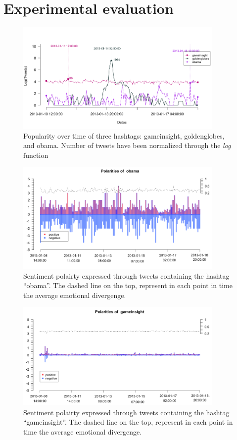 \section{Experimental evaluation}
\label{sec:results}
\begin{figure}[!Ht]
\includegraphics[width=0.9\textwidth]{images/3-plots.png} 
\caption{Popularity over time of three hashtags: gameinsight, goldenglobes, and obama. Number of tweets have been normalized through the \emph{log} function}
\label{fig:trends}
\end{figure}

\begin{figure}[!Ht]
\includegraphics[width=0.9\textwidth]{images/obama-sentiment.png} 
\caption{Sentiment polairty expressed through tweets containing the hashtag ``obama''. The dashed line on the top, represent in each point in time the average emotional divergenge.}
\label{fig:obama-sentiment}
\end{figure}

\begin{figure}[!Ht]
\includegraphics[width=0.9\textwidth]{images/game-sentiment.png} 
\caption{Sentiment polairty expressed through tweets containing the hashtag ``gameinsight''. The dashed line on the top, represent in each point in time the average emotional divergenge.}
\label{fig:game-sentiment}
\end{figure}



